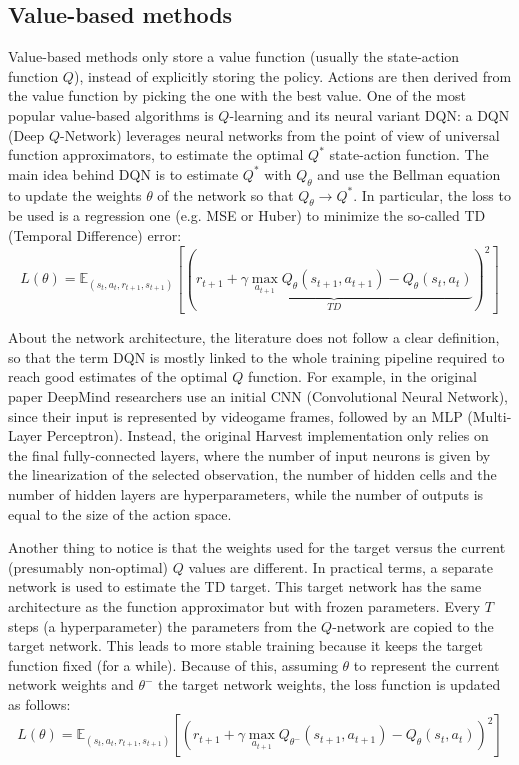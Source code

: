 \documentclass{article}
\begin{document}
\subsection{Value-based methods}
Value-based methods only store a value function (usually the state-action function $Q$), instead of explicitly storing the policy. Actions are then derived from the value function by picking the one with the best value. One of the most popular value-based algorithms is $Q$-learning and its neural variant DQN: a DQN (Deep $Q$-Network) \cite{dqn} leverages neural networks from the point of view of universal function approximators, to estimate the optimal $Q^*$ state-action function. The main idea behind DQN is to estimate $Q^*$ with $Q_\theta$ and use the Bellman equation to update the weights $\theta$ of the network so that $Q_\theta\rightarrow Q^*$. In particular, the loss to be used is a regression one (e.g. MSE or Huber) to minimize the so-called TD (Temporal Difference) error:
$$
L(\theta)=\mathbb{E}_{(s_t,a_t,r_{t+1},s_{t+1})}\left[\left(\underbrace{r_{t+1}+\gamma\max_{a_{t+1}}Q_\theta(s_{t+1}, a_{t+1}) - Q_\theta(s_t, a_t)}_{TD}\right)^2\right]
$$

About the network architecture, the literature does not follow a clear definition, so that the term DQN is mostly linked to the whole training pipeline required to reach good estimates of the optimal $Q$ function. For example, in the original paper \cite{dqn} DeepMind researchers use an initial CNN (Convolutional Neural Network), since their input is represented by videogame frames, followed by an MLP (Multi-Layer Perceptron). Instead, the original Harvest implementation \cite{harvest} only relies on the final fully-connected layers, where the number of input neurons is given by the linearization of the selected observation, the number of hidden cells and the number of hidden layers are hyperparameters, while the number of outputs is equal to the size of the action space. 

Another thing to notice is that the weights used for the target versus the current (presumably non-optimal) $Q$ values are different. In practical terms, a separate network is used to estimate the TD target. This target network has the same architecture as the function approximator but with frozen parameters. Every $T$ steps (a hyperparameter) the parameters from the $Q$-network are copied to the target network. This leads to more stable training because it keeps the target function fixed (for a while). Because of this, assuming $\theta$ to represent the current network weights and $\theta^{-}$ the target network weights, the loss function is updated as follows:
$$
L(\theta)=\mathbb{E}_{(s_t,a_t,r_{t+1},s_{t+1})}\left[\left(r_{t+1}+\gamma\max_{a_{t+1}}Q_{\theta^{-}}(s_{t+1}, a_{t+1}) - Q_{\theta}(s_t, a_t)\right)^2\right]
$$
\end{document}
